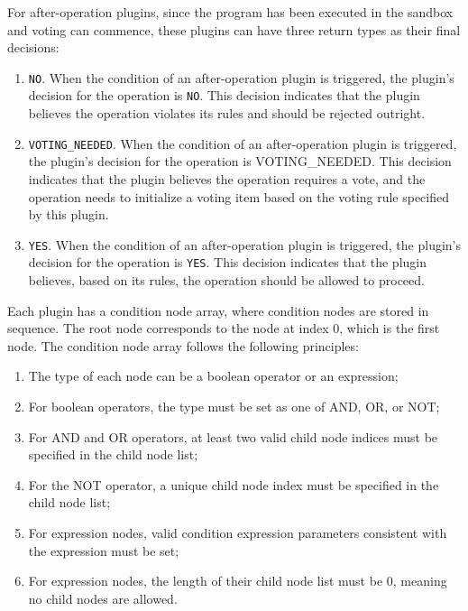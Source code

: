 \documentclass[main.tex]{subfiles}
\begin{document}
For after-operation plugins, since the program has been executed in the sandbox and voting can commence, these plugins can have three return types as their final decisions:

\begin{enumerate}
    \item \texttt{NO}. When the condition of an after-operation plugin is triggered, the plugin's decision for the operation is \texttt{NO}. This decision indicates that the plugin believes the operation violates its rules and should be rejected outright.

    \item \texttt{VOTING\_NEEDED}. When the condition of an after-operation plugin is triggered, the plugin's decision for the operation is {VOTING\_NEEDED}. This decision indicates that the plugin believes the operation requires a vote, and the operation needs to initialize a voting item based on the voting rule specified by this plugin.

    \item \texttt{YES}. When the condition of an after-operation plugin is triggered, the plugin's decision for the operation is \texttt{YES}. This decision indicates that the plugin believes, based on its rules, the operation should be allowed to proceed.
\end{enumerate}


Each plugin has a condition node array, where condition nodes are stored in sequence. The root node corresponds to the node at index 0, which is the first node. The condition node array follows the following principles:

\begin{enumerate}
    \item The type of each node can be a boolean operator or an expression;
    \item For boolean operators, the type must be set as one of AND, OR, or NOT;
    \item For AND and OR operators, at least two valid child node indices must be specified in the child node list;
    \item For the NOT operator, a unique child node index must be specified in the child node list;
    \item For expression nodes, valid condition expression parameters consistent with the expression must be set;
    \item For expression nodes, the length of their child node list must be 0, meaning no child nodes are allowed.
\end{enumerate}
\end{document}
